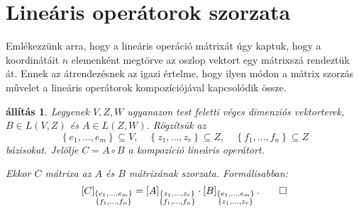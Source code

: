 \documentclass[9pt, showtrims]{memoir}
\theoremstyle{plain}
\newtheorem{proposition}{állítás}[section]
\theoremstyle{remark}
\theoremstyle{definition}
\begin{document}
\section{Lineáris operátorok szorzata}
Emlékezzünk arra, hogy a lineáris operáció mátrixát úgy kaptuk, hogy a koordinátáit $n$ elemenként
megtörve az oszlop vektort egy mátrixszá rendeztük át.
Ennek az átrendezésnek az igazi értelme, hogy ilyen módon a mátrix szorzás művelet a lineáris operátorok kompozíciójával
kapcsolódik össze.
\begin{proposition}
    Legyenek $V,Z,W$ ugyanazon test feletti véges dimenziós vektorterek,
    $B \in L\left( V,Z \right)$ és $A \in L\left( Z,W \right)$.
    Rögzítsük az 
    \[
        \left\{ e_1,\dots,e_m \right\}\subseteq V,\quad
        \left\{ z_1,\dots,z_r \right\}\subseteq Z,\quad
        \left\{ f_1,\dots,f_n \right\}\subseteq Z
    \]
    bázisokat.
    Jelölje $C=A\circ B$ a kompozíció lineáris operátort.

    Ekkor $C$ mátrixa az $A$ és $B$ mátrixának szorzata.
    Formálisabban:
    \[
        \left[ C \right]_{\substack{\left\{ e_1,\dots,e_m \right\}\\ \left\{ f_1,\dots,f_n \right\}}}
        =
        \left[ A \right]_{\substack{\left\{ z_1,\dots,z_r \right\}\\ \left\{ f_1,\dots,f_n \right\}}}
        \cdot
        \left[ B \right]_{\substack{\left\{ e_1,\dots,e_m \right\}\\ \left\{ z_1,\dots,z_r \right\}}}.\qedhere
    \]
\end{proposition}
\end{document}
